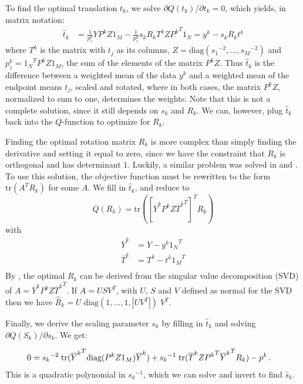 \documentclass[10pt,a4paper,oneside]{article}
\theoremstyle{definition}
\newcommand{\p}{\mbox{\,.}}
\newcommand{\ol}[1]{\overline{#1}}
\theoremstyle{definition}
\begin{document}
To find the optimal translation $t_k$, we solve $\partial Q(t_k)/\partial t_k = 0$, which yields, in matrix notation:
\begin{align*}
\hat t_k &= \frac{1}{p^k_z}YP^kZ1_M - \frac{1}{p^k_z}s_kR_kT^kZ{P^k}^T1_N = y^k - s_kR_k t^k
\end{align*} 
where $T^k$ is the matrix with $t_j$ as its columns, $Z = \text{diag}({s_1}^{-2}, \ldots, {s_M}^{-2})$ and ${p^k_z} = {1_N}^TP^kZ1_M$, the sum of the elements of the matrix $P^kZ$. Thus $\hat t_k$ is the difference between a weighted mean of the data $y^k$ and a weighted mean of the endpoint means $t_j$, scaled and rotated, where in both cases, the matrix  $P^kZ$, normalized to sum to one, determines the weights. Note that this is not a complete solution, since it still depends on $s_k$ and $R_k$. We can, however, plug $\hat t_k$ back into the $Q$-function to optimize for $R_k$.

Finding the optimal rotation matrix $R_k$ is more complex than simply finding the derivative and setting it equal to zero, since we have the constraint that $R_k$ is orthogonal and has determinant $1$. Luckily, a similar problem was solved in \cite{umeyama1991least} and \cite{myronenko2010point}. To use this solution, the objective function must be rewritten to the form $\text{tr}(A^TR_k)$ for some $A$. We fill in $\hat t_k$, and reduce to
\[ 
Q(R_k) = \text{tr}\left(\left[\ol{Y}^kP^kZ{\ol{T}^k}^T\right]^TR_k\right) 
\]
with 
\begin{align*}
\ol{Y}^k &= Y - y^k {1_N}^T\\
\ol{T}^k &= T^k - t^k {1_M}^T\\
\end{align*}
By \cite[Lemma~1]{myronenko2010point}, the optimal $R_k$ can be derived from the singular value decomposition (SVD) of $A=\ol{Y}^kP^kZ{\ol{T}^k}^T$. If $A = USV^T$, with $U$, $S$ and $V$ defined as normal for the SVD then we have $\hat R_k = U \;\text{diag} (1, \ldots, 1, |UV^T|)\; V^T$.

Finally, we derive the scaling parameter $s_k$ by filling in $\hat t_k$ and solving $\partial Q(S_k)/\partial s_k$. We get:

\begin{align*}
0 &= {s_k}^{-2}\;\text{tr}({\ol{Y}^k}^T\text{diag}(P^kZ1_M)\ol{Y}^k) + {s_k}^{-1}\;\text{tr}(\ol{T}^kZ{P^k}^T{\ol{Y}^k}^TR_k) -p^k \p
\end{align*}
This is a quadratic polynomial in ${s_k}^{-1}$, which we can solve and invert to find $\hat s_k$.
\end{document}
